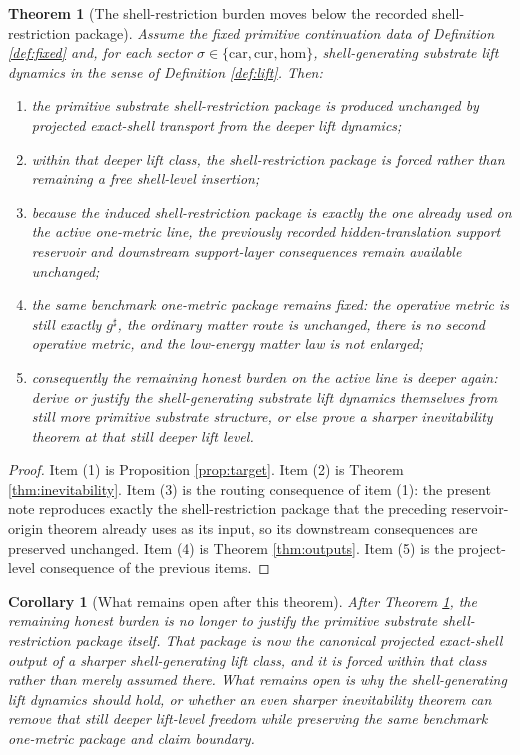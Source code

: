 \documentclass[11pt]{article}
\newcommand{\CompletedMetric}{g^{\sharp}}
\newcommand{\Car}{\mathrm{car}}
\newcommand{\Cur}{\mathrm{cur}}
\newcommand{\Hom}{\mathrm{hom}}
\newtheorem{corollary}{Corollary}
\newtheorem{theorem}{Theorem}
\begin{document}
\begin{theorem}[The shell-restriction burden moves below the recorded shell-restriction package]
\label{thm:main}
Assume the fixed primitive continuation data of Definition \ref{def:fixed} and, for each sector \(\sigma\in\{\Car,\Cur,\Hom\}\), shell-generating substrate lift dynamics in the sense of Definition \ref{def:lift}. Then:
\begin{enumerate}
    \item the primitive substrate shell-restriction package is produced unchanged by projected exact-shell transport from the deeper lift dynamics;
    \item within that deeper lift class, the shell-restriction package is forced rather than remaining a free shell-level insertion;
    \item because the induced shell-restriction package is exactly the one already used on the active one-metric line, the previously recorded hidden-translation support reservoir and downstream support-layer consequences remain available unchanged;
    \item the same benchmark one-metric package remains fixed: the operative metric is still exactly \(\CompletedMetric\), the ordinary matter route is unchanged, there is no second operative metric, and the low-energy matter law is not enlarged;
    \item consequently the remaining honest burden on the active line is deeper again: derive or justify the shell-generating substrate lift dynamics themselves from still more primitive substrate structure, or else prove a sharper inevitability theorem at that still deeper lift level.
\end{enumerate}
\end{theorem}

\begin{proof}
Item (1) is Proposition \ref{prop:target}. Item (2) is Theorem \ref{thm:inevitability}. Item (3) is the routing consequence of item (1): the present note reproduces exactly the shell-restriction package that the preceding reservoir-origin theorem already uses as its input, so its downstream consequences are preserved unchanged. Item (4) is Theorem \ref{thm:outputs}. Item (5) is the project-level consequence of the previous items.
\end{proof}

\begin{corollary}[What remains open after this theorem]
\label{cor:next}
After Theorem \ref{thm:main}, the remaining honest burden is no longer to justify the primitive substrate shell-restriction package itself. That package is now the canonical projected exact-shell output of a sharper shell-generating lift class, and it is forced within that class rather than merely assumed there. What remains open is why the shell-generating lift dynamics should hold, or whether an even sharper inevitability theorem can remove that still deeper lift-level freedom while preserving the same benchmark one-metric package and claim boundary.
\end{corollary}
\end{document}
